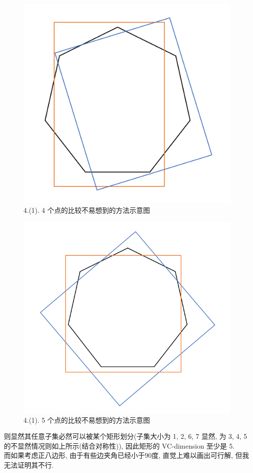 \documentclass[UTF8]{article}
\begin{document}
\begin{center}
\begin{minipage}{\linewidth/4}
\begin{figure}[H]
	\includegraphics[width=\linewidth]{image/4.1.4.png}
	\caption{4.(1). 4 个点的比较不易想到的方法示意图}
\end{figure}
\end{minipage}
\begin{minipage}{\linewidth/4}
\begin{figure}[H]
	\centering
	\includegraphics[width=\linewidth]{image/4.1.5.png}
	\caption{4.(1). 5 个点的比较不易想到的方法示意图}
\end{figure}
\end{minipage}
\end{center}
则显然其任意子集必然可以被某个矩形划分(子集大小为 1, 2, 6, 7 显然, 为 3, 4, 5 的不显然情况则如上所示(结合对称性)), 因此矩形的 VC-dimension 至少是 5. \\
而如果考虑正八边形, 由于有些边夹角已经小于90度, 直觉上难以画出可行解, 但我无法证明其不行.
\end{document}
